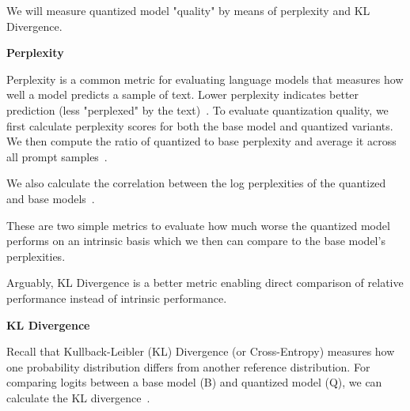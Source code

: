 We will measure quantized model "quality" by means of perplexity and KL Divergence.

\textbf{Perplexity}

Perplexity is a common metric for evaluating language models that measures how well a model predicts a sample of text. Lower perplexity indicates better prediction (less "perplexed" by the text)~.
To evaluate quantization quality, we first calculate perplexity scores for both the base model and quantized variants. We then compute the ratio of quantized to base perplexity and average it across all prompt samples~.

We also calculate the correlation between the log perplexities of the quantized and base models~.

These are two simple metrics to evaluate how much worse the quantized model performs on an intrinsic basis which we then can compare to the base model's perplexities.

Arguably, KL Divergence is a better metric enabling direct comparison of relative performance instead of intrinsic performance.

\textbf{KL Divergence}

Recall that Kullback-Leibler (KL) Divergence (or Cross-Entropy) measures how one probability distribution differs from another reference distribution. For comparing logits between a base model (B) and quantized model (Q), we can calculate the KL divergence~.

